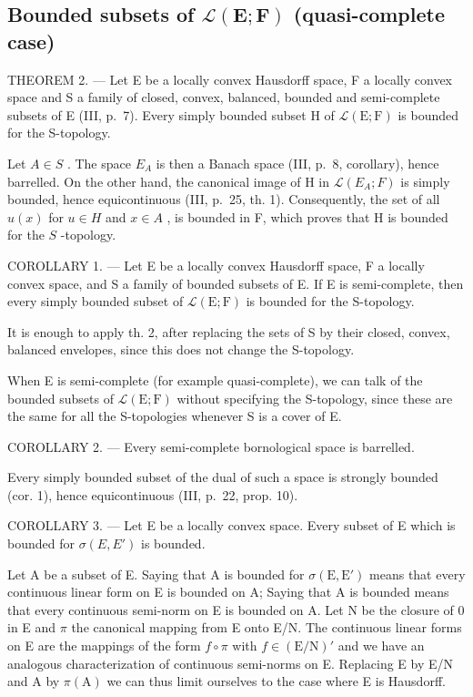 \subsection{\texorpdfstring{Bounded subsets of \(\mathcal{L}(\mathbf{E};\mathbf{F})\) (quasi-complete case)}{Bounded subsets of \textbackslash mathcal\{L\}(\textbackslash mathbf\{E\};\textbackslash mathbf\{F\}) (quasi-complete case)}}

THEOREM 2. --- Let E be a locally convex Hausdorff space, F a locally convex space and S a family of closed, convex, balanced, bounded and semi-complete subsets of E (III, p.~7). Every simply bounded subset H of \(\mathcal{L}(\mathrm{E};\mathrm{F})\) is bounded for the S-topology.

Let \(A \in S\) . The space \(E_A\) is then a Banach space (III, p.~8, corollary), hence barrelled. On the other hand, the canonical image of H in \(\mathcal{L}(E_A; F)\) is simply bounded, hence equicontinuous (III, p.~25, th. 1). Consequently, the set of all \(u(x)\) for \(u \in H\) and \(x \in A\) , is bounded in F, which proves that H is bounded for the \(S\) -topology.

COROLLARY 1. --- Let E be a locally convex Hausdorff space, F a locally convex space, and S a family of bounded subsets of E. If E is semi-complete, then every simply bounded subset of \(\mathcal{L}(\mathrm{E};\mathrm{F})\) is bounded for the S-topology.

It is enough to apply th. 2, after replacing the sets of S by their closed, convex, balanced envelopes, since this does not change the S-topology.

When E is semi-complete (for example quasi-complete), we can talk of the bounded subsets of \(\mathcal{L}(\mathrm{E};\mathrm{F})\) without specifying the S-topology, since these are the same for all the S-topologies whenever S is a cover of E.

COROLLARY 2. --- Every semi-complete bornological space is barrelled.

Every simply bounded subset of the dual of such a space is strongly bounded (cor. 1), hence equicontinuous (III, p.~22, prop. 10).

COROLLARY 3. --- Let E be a locally convex space. Every subset of E which is bounded for \(\sigma(E, E')\) is bounded.

Let A be a subset of E. Saying that A is bounded for \(\sigma(\mathrm{E}, \mathrm{E}')\) means that every continuous linear form on E is bounded on A; Saying that A is bounded means that every continuous semi-norm on E is bounded on A. Let N be the closure of 0 in E and \(\pi\) the canonical mapping from E onto E/N. The continuous linear forms on E are the mappings of the form \(f \circ \pi\) with \(f \in (\mathrm{E}/\mathrm{N})'\) and we have an analogous characterization of continuous semi-norms on E. Replacing E by E/N and A by \(\pi(\mathrm{A})\) we can thus limit ourselves to the case where E is Hausdorff.

